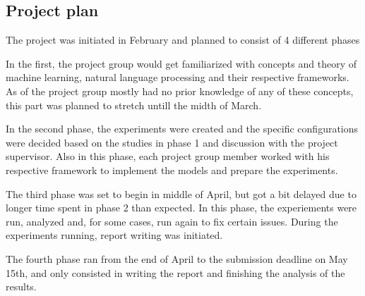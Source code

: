 \subsection{Project plan}

The project was initiated in February and planned to consist of 4 different
phases

In the first, the project group would get familiarized with concepts and theory of
machine learning, natural language processing and their respective frameworks.
As of the project group mostly had no prior knowledge of any of these concepts,
this part was planned to stretch untill the midth of March.

In the second phase, the experiments were created and the specific
configurations were decided based on the studies in phase 1 and discussion with
the project supervisor. Also in this phase, each project group member worked
with his respective framework to implement the models and prepare the
experiments.

The third phase was set to begin in middle of April, but got a bit delayed due
to longer time spent in phase 2 than expected. In this phase, the experiements
were run, analyzed and, for some cases, run again to fix certain issues. During
the experiments running, report writing was initiated.

The fourth phase ran from the end of April to the submission deadline on May
15th, and only consisted in writing the report and finishing the analysis of the
results.

\pagebreak
